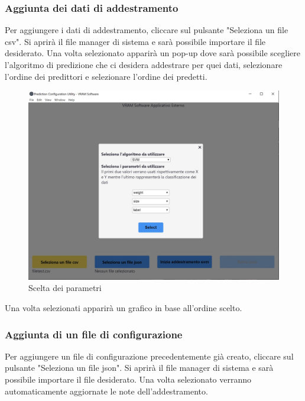 		\subsubsection{Aggiunta dei dati di addestramento}
		Per aggiungere i dati di addestramento, cliccare sul pulsante "Seleziona un file csv".
		Si aprirà il file manager di sistema e sarà possibile importare il file desiderato. Una volta selezionato apparirà un pop-up dove sarà possibile scegliere l'algoritmo di predizione che ci desidera addestrare per quei dati, selezionare l'ordine dei predittori e selezionare l'ordine dei predetti.
		\mbox{}
		\begin{figure} [H]
			\begin{center}
				\includegraphics[width=\linewidth]{./img/2.jpg}
			\end{center}
			\caption{Scelta dei parametri}
		\end{figure}
		\mbox{}
		Una volta selezionati apparirà un grafico in base all'ordine scelto.
		\subsubsection{Aggiunta di un file di configurazione}
		Per aggiungere un file di configurazione precedentemente già creato, cliccare sul pulsante "Seleziona un file json".
		Si aprirà il file manager di sistema e sarà possibile importare il file desiderato. Una volta selezionato verranno automaticamente aggiornate le note dell'addestramento.
